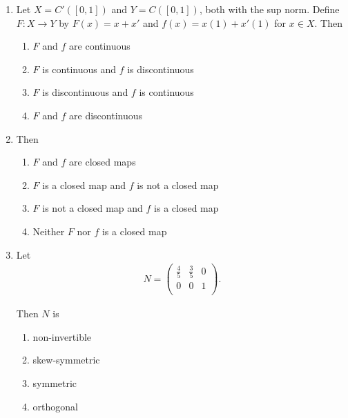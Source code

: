 \documentclass[journal]{IEEEtran}
\numberwithin{equation}{enumi}
\numberwithin{figure}{enumi}
\begin{document}
\begin{enumerate}
\item
Let $X = C'([0,1])$ and $Y = C([0,1])$, both with the sup norm. Define $F: X \to Y$ by $F(x) = x + x'$ and $f(x) = x(1) + x'(1)$ for $x \in X$. Then
\hfill{}
\begin{multicols}{2}
\begin{enumerate}
    \item $F$ and $f$ are continuous
    \item $F$ is continuous and $f$ is discontinuous
    \item $F$ is discontinuous and $f$ is continuous
    \item $F$ and $f$ are discontinuous
\end{enumerate}
\end{multicols}

\item
Then
\hfill{}
\begin{multicols}{2}
\begin{enumerate}
    \item $F$ and $f$ are closed maps
    \item $F$ is a closed map and $f$ is not a closed map
    \item $F$ is not a closed map and $f$ is a closed map
    \item Neither $F$ nor $f$ is a closed map
\end{enumerate}
\end{multicols}

\item
Let
\begin{align}
   N =
\begin{pmatrix}
\frac{4}{5} & \frac{3}{5} & 0 \\
0 & 0 & 1 \\
\end{pmatrix}. 
\end{align}

Then $N$ is
\hfill{}
\begin{multicols}{2}
\begin{enumerate}
    \item non-invertible
    \item skew-symmetric
    \item symmetric
    \item orthogonal
\end{enumerate}
\end{multicols}


\end{enumerate}
\end{document}
